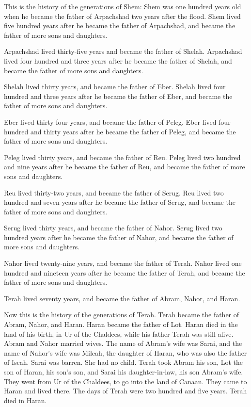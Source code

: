  This is the history of the generations of Shem: Shem was
one hundred years old when he became the father of Arpachshad two years
after the flood.  Shem lived five hundred years after he
became the father of Arpachshad, and became the father of more sons and
daughters.

 Arpachshad lived thirty-five years and became the father
of Shelah.  Arpachshad lived four hundred and three years
after he became the father of Shelah, and became the father of more sons
and daughters.

 Shelah lived thirty years, and became the father of Eber.
 Shelah lived four hundred and three years after he became
the father of Eber, and became the father of more sons and daughters.

 Eber lived thirty-four years, and became the father of
Peleg.  Eber lived four hundred and thirty years after he
became the father of Peleg, and became the father of more sons and
daughters.

 Peleg lived thirty years, and became the father of Reu.
 Peleg lived two hundred and nine years after he became the
father of Reu, and became the father of more sons and daughters.

 Reu lived thirty-two years, and became the father of
Serug.  Reu lived two hundred and seven years after he
became the father of Serug, and became the father of more sons and
daughters.

 Serug lived thirty years, and became the father of Nahor.
 Serug lived two hundred years after he became the father
of Nahor, and became the father of more sons and daughters.

 Nahor lived twenty-nine years, and became the father of
Terah.  Nahor lived one hundred and nineteen years after he
became the father of Terah, and became the father of more sons and
daughters.

 Terah lived seventy years, and became the father of Abram,
Nahor, and Haran.

 Now this is the history of the generations of Terah. Terah
became the father of Abram, Nahor, and Haran. Haran became the father of
Lot.  Haran died in the land of his birth, in Ur of the
Chaldees, while his father Terah was still alive.  Abram
and Nahor married wives. The name of Abram's wife was Sarai, and the
name of Nahor's wife was Milcah, the daughter of Haran, who was also the
father of Iscah.  Sarai was barren. She had no child.
 Terah took Abram his son, Lot the son of Haran, his son's
son, and Sarai his daughter-in-law, his son Abram's wife. They went from
Ur of the Chaldees, to go into the land of Canaan. They came to Haran
and lived there.  The days of Terah were two hundred and
five years. Terah died in Haran.

